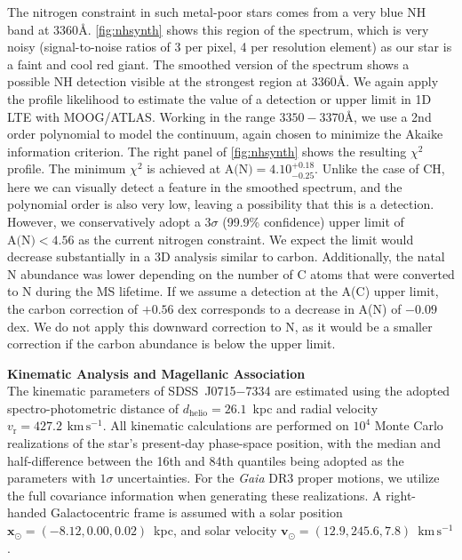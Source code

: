 \documentclass{natureprintstyle}
\newcommand{\unit}[1]{\ensuremath{\mathrm{\,#1}}\xspace}
\newcommand{\kms}{\unit{km\,s^{-1}}}
\newcommand{\umpstarsdss}{SDSS~J0715$-$7334\xspace}
\begin{document}
The nitrogen constraint in such metal-poor stars comes from a very blue NH band at 3360{\AA}.
\ref{fig:nhsynth} shows this region of the spectrum, which is very noisy (signal-to-noise ratios of 3 per pixel, 4 per resolution element) as our star is a faint and cool red giant.
The smoothed version of the spectrum shows a possible NH detection visible at the strongest region at 3360{\AA}.
We again apply the profile likelihood to estimate the value of a detection or upper limit in 1D LTE with MOOG/ATLAS.
Working in the range $3350-3370${\AA}, we use a 2nd order polynomial to model the continuum, again chosen to minimize the Akaike information criterion.
The right panel of \ref{fig:nhsynth} shows the resulting $\chi^2$ profile. The minimum $\chi^2$ is achieved at $\mbox{A(N)} = 4.10^{+0.18}_{-0.25}$.
Unlike the case of CH, here we can visually detect a feature in the smoothed spectrum, and the polynomial order is also very low, leaving a possibility that this is a detection.
However, we conservatively adopt a $3\sigma$ (99.9\% confidence) upper limit of $\mbox{A(N)} < 4.56$ as the current nitrogen constraint. We expect the limit would decrease substantially in a 3D analysis similar to carbon. Additionally, the natal N abundance was lower depending on the number of C atoms that were converted to N during the MS lifetime. If we assume a detection at the A(C) upper limit, the carbon correction of $+0.56$ dex corresponds to a decrease in A(N) of $-0.09$ dex. We do not apply this downward correction to N, as it would be a smaller correction if the carbon abundance is below the upper limit.




\vspace{1mm}
\noindent
{\bf Kinematic Analysis and Magellanic Association}
\\
\noindent
The kinematic parameters of \umpstarsdss{} are estimated using the adopted spectro-photometric distance of $d_\mathrm{helio} = 26.1$~kpc and radial velocity $v_\mathrm{r} = 427.2~\kms$. 
All kinematic calculations are performed on $10^4$ Monte Carlo realizations of the  star's present-day phase-space position, with the median and half-difference between the 16th and 84th quantiles being adopted as the parameters with $1\sigma$ uncertainties. 
For the \textit{Gaia} DR3 proper motions, we utilize the full covariance information when generating these realizations. 
A right-handed Galactocentric frame is assumed with a solar position $\mathbf{x}_\odot = (-8.12, 0.00, 0.02)$~kpc, and solar velocity $\mathbf{v}_\odot = (12.9, 245.6, 7.8)$~$\mathrm{km\,s^{-1}}$ \cite{Reid2004,Drimmel2018,GravityCollaboration2019}. 
\end{document}
